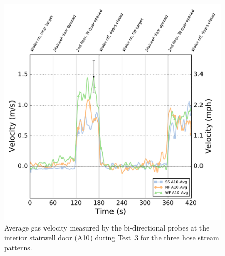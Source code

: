 \documentclass[12pt,oneside]{book}
\begin{document}
\begin{figure}[!ht]
	\includegraphics[width=\columnwidth]{../Figures/Plots/Test_17_West_063014_BDP_A10_stream_avgs}
	\caption[Average gas velocity through the interior stairwell door during Test~3 for the three hose stream patterns.]{Average gas velocity measured by the bi-directional probes at the interior stairwell door (A10) during Test~3 for the three hose stream patterns.}
	\label{fig:Test_3_BDP_A10_Avg_All}
	\end{figure}
\FloatBarrier
\end{document}

